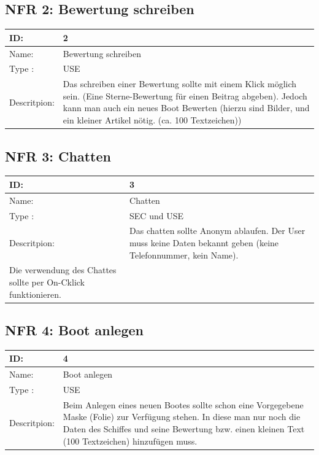 \documentclass[12pt]{article}
\theoremstyle{definition}
\begin{document}
\subsection{NFR 2: Bewertung schreiben}
\begin{tabular}{|p{.2\linewidth}|p{.65\linewidth}|}
\hline 
ID: & 2 \\ \hline
Name: & Bewertung schreiben \\ \hline
Type	: & USE \\ \hline
Descritpion: &  Das schreiben einer Bewertung sollte mit einem Klick möglich sein. (Eine Sterne-Bewertung für einen Beitrag abgeben). Jedoch kann man auch ein neues Boot Bewerten (hierzu sind Bilder, und ein kleiner Artikel nötig. (ca. 100 Textzeichen))\\ \hline
\end{tabular}

\subsection{NFR 3: Chatten}
\begin{tabular}{|p{.2\linewidth}|p{.65\linewidth}|}
\hline 
ID: & 3 \\ \hline
Name: & Chatten \\ \hline
Type	: & SEC und USE \\ \hline
Descritpion: &  Das chatten sollte Anonym ablaufen. Der User muss keine Daten bekannt geben (keine Telefonnummer, kein Name). \\Die verwendung des Chattes sollte per On-Cklick funktionieren. \\ \hline
\end{tabular}

\subsection{NFR 4: Boot anlegen}
\begin{tabular}{|p{.2\linewidth}|p{.65\linewidth}|}
\hline 
ID: & 4 \\ \hline
Name: & Boot anlegen \\ \hline
Type	: & USE \\ \hline
Descritpion: &  Beim Anlegen eines neuen Bootes sollte schon eine Vorgegebene Maske (Folie) zur Verfügung stehen. In diese man nur noch die Daten des Schiffes und seine Bewertung bzw. einen kleinen Text (100 Textzeichen) hinzufügen muss.\\ \hline
\end{tabular}
\pagebreak
\end{document}
